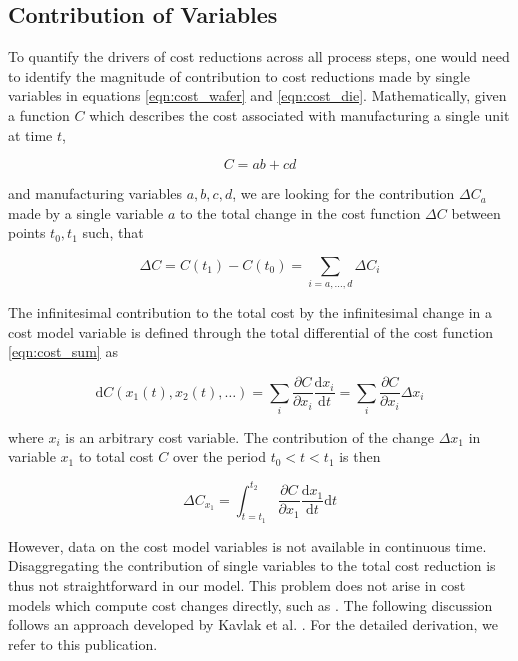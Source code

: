 \documentclass[10pt]{article}
\begin{document}
\subsection{Contribution of Variables}

To quantify the drivers of cost reductions across all process steps, one would need to identify the magnitude of contribution to cost reductions made by single variables in equations \ref{eqn:cost_wafer} and \ref{eqn:cost_die}. Mathematically, given a function $C$ which describes the cost associated with manufacturing a single unit at time $t$,

\begin{equation}
C=ab+cd
\end{equation}

and manufacturing variables $a,b,c,d$, we are looking for the contribution $\Delta C_{a}$ made by a single variable $a$ to the total change in the cost function $\Delta C$ between points $t_0,t_1$ such, that

\begin{equation}
\Delta C = C(t_1)-C(t_0) = \sum_{i=a, \dots, d} \Delta C_i
\end{equation}

The infinitesimal contribution to the total cost by the infinitesimal change in a cost model variable is defined through the total differential of the cost function \ref{eqn:cost_sum} as

\begin{equation}
\text{d}C(x_1 (t), x_2(t), \dots) = \sum_i \frac{\partial C }{\partial x_i}     \frac{\text{d}x_i}{\text{d}t} = \sum_i \frac{\partial C }{\partial x_i}  \Delta x_i
\end{equation}

where $x_i$ is an arbitrary cost variable. The contribution of the change $\Delta x_1$ in variable $x_1$ to total cost $C$ over the period $t_0 < t < t_1 $ is then

\begin{equation}
\Delta C_{x_1} = \int_{t=t_1}^{t_2} \frac{\partial C }{\partial x_1} \frac{\text{d}x_1}{\text{d}t} \text{d}t
\label{eqn:integral_1}
\end{equation}

However, data on the cost model variables is not available in continuous time. Disaggregating the contribution of single variables to the total cost reduction is thus not straightforward in our model. This problem does not arise in cost models which compute cost changes directly, such as \cite{nemet2012solar} \cite{goodrich2013assessing}. The following discussion follows an approach developed by Kavlak et al. \cite{kavlak2018evaluating}. For the detailed derivation, we refer to this publication.
\end{document}
